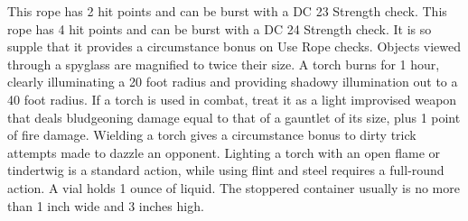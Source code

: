  This rope has 2 hit points and can be burst with a DC 23 Strength check.
 This rope has 4 hit points and can be burst with a DC 24 Strength check. It is so supple that it provides a  circumstance bonus on Use Rope checks.
 Objects viewed through a spyglass are magnified to twice their size.
 A torch burns for 1 hour, clearly illuminating a 20 foot radius and providing shadowy illumination out to a 40 foot radius. If a torch is used in combat, treat it as a light improvised weapon that deals bludgeoning damage equal to that of a gauntlet of its size, plus 1 point of fire damage. Wielding a torch gives a  circumstance bonus to dirty trick attempts made to dazzle an opponent. Lighting a torch with an open flame or tindertwig is a standard action, while using flint and steel requires a full-round action.
 A vial holds 1 ounce of liquid. The stoppered container usually is no more than 1 inch wide and 3 inches high.

